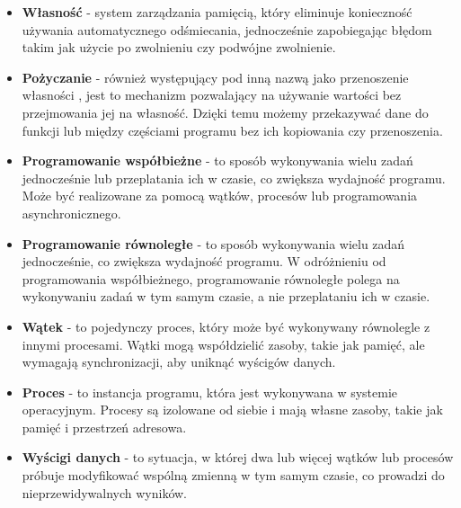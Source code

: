 \begin{itemize}
    \item \textbf{Własność } - system zarządzania pamięcią, który eliminuje konieczność używania automatycznego odśmiecania, jednocześnie zapobiegając błędom takim jak użycie po zwolnieniu czy podwójne zwolnienie.


    \item \textbf{Pożyczanie } - również występujący pod inną nazwą jako przenoszenie własności \cite{rustPolishNames}, jest to mechanizm pozwalający na używanie wartości bez przejmowania jej na własność. Dzięki temu możemy przekazywać dane do funkcji lub między częściami programu bez ich kopiowania czy przenoszenia.
    
    \item \textbf{Programowanie współbieżne} -  to sposób wykonywania wielu zadań jednocześnie lub przeplatania ich w czasie, co zwiększa wydajność programu. Może być realizowane za pomocą wątków, procesów lub programowania asynchronicznego.
    
    \item \textbf{Programowanie równoległe} - to sposób wykonywania wielu zadań jednocześnie, co zwiększa wydajność programu. W odróżnieniu od programowania współbieżnego, programowanie równoległe polega na wykonywaniu zadań w tym samym czasie, a nie przeplataniu ich w czasie.
    
    \item \textbf{Wątek} - to pojedynczy proces, który może być wykonywany równolegle z innymi procesami. Wątki mogą współdzielić zasoby, takie jak pamięć, ale wymagają synchronizacji, aby uniknąć wyścigów danych.
    \item \textbf{Proces} - to instancja programu, która jest wykonywana w systemie operacyjnym. Procesy są izolowane od siebie i mają własne zasoby, takie jak pamięć i przestrzeń adresowa.
    \item \textbf{Wyścigi danych } - to sytuacja, w której dwa lub więcej wątków lub procesów próbuje modyfikować wspólną zmienną w tym samym czasie, co prowadzi do nieprzewidywalnych wyników.
\end{itemize}